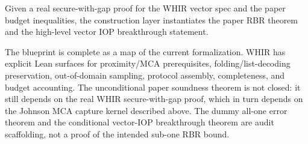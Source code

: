 \begin{theorem}\label{thm:whir_vector_iop_breakthrough}
    Given a real secure-with-gap proof for the WHIR vector spec and the paper budget
    inequalities, the construction layer instantiates the paper RBR theorem and the
    high-level vector IOP breakthrough statement.
\end{theorem}

\begin{remark}\label{rem:whir_status}
    The blueprint is complete as a map of the current formalization.  WHIR has explicit Lean
    surfaces for proximity/MCA prerequisites, folding/list-decoding preservation,
    out-of-domain sampling, protocol assembly, completeness, and budget accounting.  The
    unconditional paper soundness theorem is not closed: it still depends on the real WHIR
    secure-with-gap proof, which in turn depends on the Johnson MCA capture kernel described
    above.  The dummy all-one error theorem and the conditional vector-IOP breakthrough theorem
    are audit scaffolding, not a proof of the intended sub-one RBR bound.
\end{remark}
